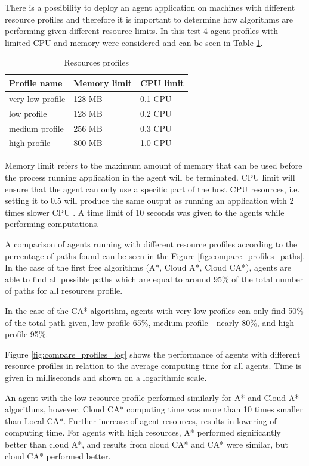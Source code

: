 There is a possibility to deploy an agent application on machines with different resource profiles and therefore it is important to determine how algorithms are performing given different resource limits.
In this test 4 agent profiles with limited CPU and memory were considered and can be seen in Table \ref{tab:resorces_profile}.
\begin{table}[H]
\caption{Resources profiles}
\label{tab:resorces_profile}
\centering
\begin{tabular}{@{}lll@{}}
\toprule
Profile name     & Memory limit & CPU limit \\ \midrule
very low profile & 128 MB        & 0.1 CPU   \\
low profile      & 128 MB        & 0.2 CPU   \\
medium profile   & 256 MB        & 0.3 CPU   \\
high profile     & 800 MB        & 1.0 CPU     \\ \bottomrule
\end{tabular}%
\end{table}

Memory limit refers to the maximum amount of memory that can be used before the process running application in the agent will be terminated. CPU limit will ensure that the agent can only use a specific part of the host CPU resources, i.e. setting it to 0.5 will produce the same output as running an application with 2 times slower CPU \cite{docker_container_limits}. A time limit of 10 seconds was given to the agents while performing computations.

A comparison of agents running with different resource profiles according to the percentage of paths found can be seen in the Figure \ref{fig:compare_profiles_paths}. In the case of the first free algorithms (A*, Cloud A*, Cloud CA*), agents are able to find all possible paths which are equal to around 95\% of the total number of paths for all resources profile. 

In the case of the CA* algorithm, agents with very low profiles can only find 50\% of the total path given, low profile 65\%, medium profile - nearly 80\%, and high profile 95\%. 

Figure \ref{fig:compare_profiles_log} shows the performance of agents with different resource profiles in relation to the average computing time for all agents. Time is given in milliseconds and shown on a logarithmic scale.

An agent with the low resource profile performed similarly for A* and Cloud A* algorithms, however, Cloud CA* computing time was more than 10 times smaller than Local CA*. Further increase of agent resources, results in lowering of computing time. For agents with high resources, A* performed significantly better than cloud A*, and results from cloud CA* and CA* were similar, but cloud CA* performed better.

